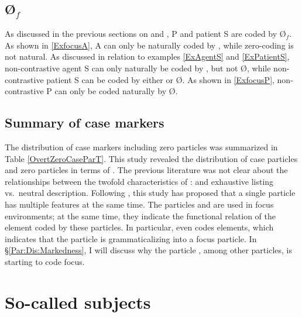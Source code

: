 
\subsection{{\O$_{f}$}}\label{FocZero}

As discussed in the previous sections on  and ,
 P and patient S are coded by {\O$_{f}$}.
As shown in \ref{ExfocusA},
 A can only be naturally coded by ,
while zero-coding is not natural.
As discussed in relation to examples \ref{ExAgentS} and \ref{ExPatientS},
non-contrastive agent S can only naturally be coded by , but not {\O},
while non-contrastive patient S can be coded by either  or {\O}.
As shown in \ref{ExfocusP},
non-contrastive P can only be coded naturally by {\O}.

\subsection{Summary of case markers}

The distribution of case markers including zero particles was summarized in Table \ref{OvertZeroCaseParT}.
This study revealed the distribution of case particles and zero particles in terms of .
The previous literature was not clear about the relationships between the twofold characteristics of :
 and exhaustive listing vs.~neutral description.
Following ,
this study has proposed that
a single particle has multiple features at the same time.
The particles  and  are used in focus environments;
at the same time, they indicate the functional relation of the element coded by these particles.
In particular,  even codes  elements,
which indicates that the particle is grammaticalizing into a focus particle.
In \S \ref{Par:Dis:Markedness},
I will discuss why the particle , among other particles,
is starting to code focus.

\section{So-called subjects}\label{Par:ArgStr}

